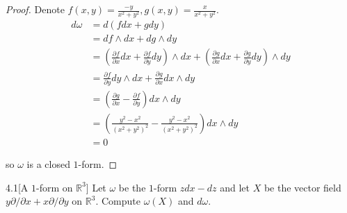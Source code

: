 \begin{proof}
	Denote \(f(x,y) = \frac{-y}{x^{2} + y^{2}}, g(x,y) = \frac{x}{x^{2} + y^{2}}\).
	\begingroup
	\allowdisplaybreaks%
	\begin{align*}
		d\omega & = d\left(fdx + gdy\right)                                                                                                                                                             \\
		        & = df \wedge dx + dg \wedge dy                                                                                                                                                         \\
		        & = \left(\frac{\partial f}{\partial x}dx + \frac{\partial f}{\partial y}dy\right) \wedge dx + \left(\frac{\partial g}{\partial x}dx + \frac{\partial g}{\partial y}dy\right) \wedge dy \\
		        & = \frac{\partial f}{\partial y} dy\wedge dx + \frac{\partial g}{\partial x} dx\wedge dy                                                                                               \\
		        & = \left(\frac{\partial g}{\partial x} - \frac{\partial f}{\partial y}\right) dx \wedge dy                                                                                             \\
		        & = \left(\frac{y^{2} - x^{2}}{{(x^{2} + y^{2})}^{2}} - \frac{y^{2} - x^{2}}{{(x^{2} + y^{2})}^{2}}\right) dx \wedge dy                                                                 \\
		        & = 0
	\end{align*}
	\endgroup

	so \( \omega \) is a closed \(1\)-form.
\end{proof}

\begin{problem}{4.1}[A \(1\)-form on \(\mathbb{R}^{3}\)]
Let \(\omega\) be the \(1\)-form \(zdx - dz\) and let \(X\) be the vector field \(y\partial/\partial x + x\partial/\partial y\) on \(\mathbb{R}^{3}\). Compute \(\omega(X)\) and \(d\omega\).
\end{problem}

